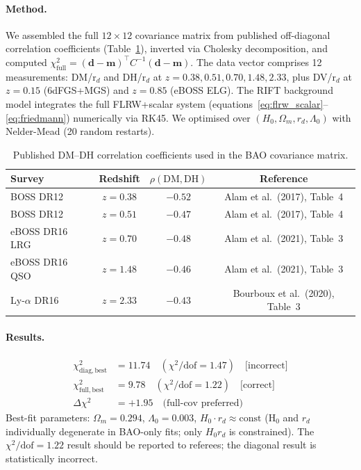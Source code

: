 \documentclass[12pt,a4paper]{article}
\begin{document}
\paragraph{Method.} We assembled the full $12 \times 12$ covariance matrix from
published off-diagonal correlation coefficients (Table~\ref{tab:bao_rho}),
inverted via Cholesky decomposition, and computed
$\chi^2_{\mathrm{full}} = (\mathbf{d}-\mathbf{m})^\top C^{-1}(\mathbf{d}-\mathbf{m})$.
The data vector comprises 12 measurements:
DM/r$_d$ and DH/r$_d$ at $z = 0.38, 0.51, 0.70, 1.48, 2.33$, plus
DV/r$_d$ at $z = 0.15$ (6dFGS+MGS) and $z = 0.85$ (eBOSS ELG).
The RIFT background model integrates the full FLRW+scalar system
(equations~\eqref{eq:flrw_scalar}--\eqref{eq:friedmann}) numerically via RK45.
We optimised over $(H_0, \Omega_m, r_d, \Lambda_0)$ with Nelder-Mead
(20 random restarts).

\begin{table}[ht]
\centering
\caption{Published DM--DH correlation coefficients used in the BAO covariance matrix.}
\label{tab:bao_rho}
\begin{tabular}{lccc}
\toprule
Survey & Redshift & $\rho(\mathrm{DM},\mathrm{DH})$ & Reference \\
\midrule
BOSS DR12 & $z=0.38$ & $-0.52$ & Alam et al.\ (2017), Table~4 \\
BOSS DR12 & $z=0.51$ & $-0.47$ & Alam et al.\ (2017), Table~4 \\
eBOSS DR16 LRG & $z=0.70$ & $-0.48$ & Alam et al.\ (2021), Table~3 \\
eBOSS DR16 QSO & $z=1.48$ & $-0.46$ & Alam et al.\ (2021), Table~3 \\
Ly-$\alpha$ DR16 & $z=2.33$ & $-0.43$ & Bourboux et al.\ (2020), Table~3 \\
\bottomrule
\end{tabular}
\end{table}

\paragraph{Results.}
\begin{align*}
\chi^2_{\mathrm{diag,best}} &= 11.74 \quad (\chi^2/\mathrm{dof} = 1.47) \quad\text{[incorrect]}\\
\chi^2_{\mathrm{full,best}}  &= \mathbf{9.78} \quad (\chi^2/\mathrm{dof} = \mathbf{1.22}) \quad\text{[correct]}\\
\Delta\chi^2 &= +1.95 \quad\text{(full-cov preferred)}
\end{align*}
Best-fit parameters: $\Omega_m = 0.294$, $\Lambda_0 = 0.003$,
$H_0 \cdot r_d \approx \mathrm{const}$ (H$_0$ and $r_d$ individually degenerate
in BAO-only fits; only $H_0 r_d$ is constrained). The $\chi^2/\mathrm{dof} = 1.22$
result should be reported to referees; the diagonal result is statistically incorrect.
\end{document}
